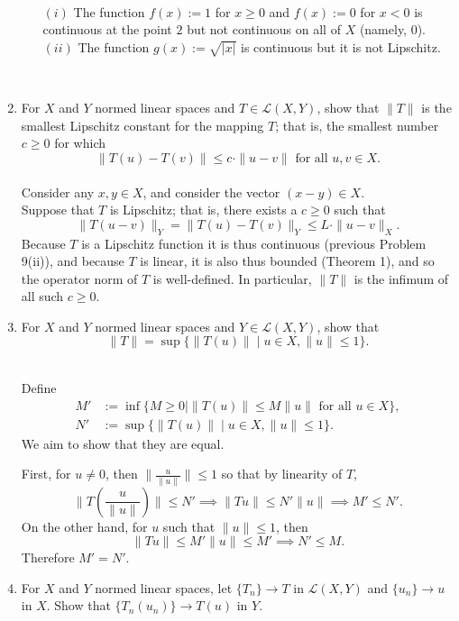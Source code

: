 \begin{enumerate}
\begin{enumerate}[(i)]
        \ \\$(i)$ The function $f(x):=1$ for $x\ge0$ and $f(x):=0$ for $x<0$ is continuous at the point $2$ but not continuous on all of $X$ (namely, $0$).
        \ \\$(ii)$ The function $g(x):=\sqrt{|x|}$ is continuous but it is not Lipschitz.
    \end{enumerate}
    \ \\\item For $X$ and $Y$ normed linear spaces and $T\in\mathcal{L}(X,Y)$, show that $\|T\|$ is the smallest Lipschitz constant for the mapping $T$; that is, the smallest number $c\ge0$ for which
    \[
        \|T(u)-T(v)\|\le c\cdot\|u-v\|\text{ for all }u,v\in X.
    \]
    \\Consider any $x,y\in X$, and consider the vector $(x-y)\in X$.
    \\Suppose that $T$ is Lipschitz; that is, there exists a $c\ge0$ such that 
    \[
        \|T(u-v)\|_Y=\|T(u)-T(v)\|_Y\le L\cdot\|u-v\|_X.
    \]
    Because $T$ is a Lipschitz function it is thus continuous (previous Problem 9(ii)), and because $T$ is linear, it is also thus bounded (Theorem 1), and so the operator norm of $T$ is well-defined.
    In particular, $\|T\|$ is the infimum of all such $c\ge0$.
    \ \\\item For $X$ and $Y$ normed linear spaces and $Y\in\mathcal{L}(X,Y)$, show that 
    \[
        \|T\|=\sup\{\|T(u)\|\mid u\in X, \|u\|\le1\}.
    \]

    \ \\Define 
    \[
        \begin{split}
        M'&:=\inf\{M\ge0\mid\|T(u)\|\le M\|u\|\text{ for all }u\in X\},\\
        N'&:=\sup\{\|T(u)\|\mid u\in X, \|u\|\le1\}.
        \end{split}
    \]
    We aim to show that they are equal.
    
    First, for $u\neq0$, then $\|\frac{u}{\|u\|}\|\le1$ so that by linearity of $T$,
    \[\|T(\frac{u}{\|u\|})\|\le N'\implies\|Tu\|\le N'\|u\|\implies M'\le N'.\]
    On the other hand, for $u$ such that $\|u\|\le1$, then
    \[\|Tu\|\le M'\|u\|\le M'\implies N'\le M.\]
    Therefore $M'=N'$.
    \ \\\item For $X$ and $Y$ normed linear spaces, let $\{T_n\}\to T$ in $\mathcal{L}(X,Y)$ and $\{u_n\}\to u$ in $X$.
    Show that $\{T_n(u_n)\}\to T(u)$ in $Y$.


\end{enumerate}
